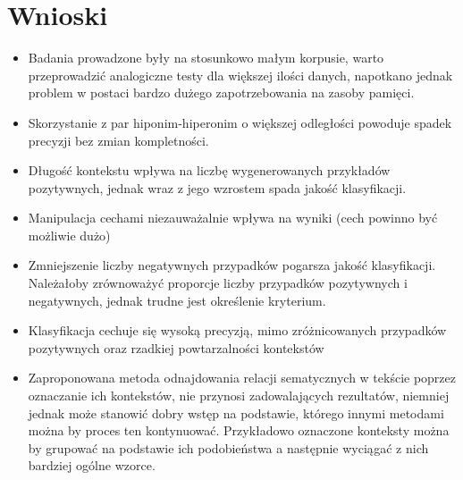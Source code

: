 \documentclass[a4paper,10pt]{report}
\begin{document}
\section{Wnioski}
\begin{itemize}
\item Badania prowadzone były na stosunkowo małym korpusie, warto przeprowadzić analogiczne testy dla większej ilości danych,
napotkano jednak problem w postaci bardzo dużego zapotrzebowania na zasoby pamięci.  

\item Skorzystanie z par hiponim-hiperonim o większej odległości powoduje spadek precyzji bez zmian kompletności.

\item Długość kontekstu wpływa na liczbę wygenerowanych przykładów pozytywnych, jednak wraz z jego wzrostem spada jakość klasyfikacji.

\item Manipulacja cechami niezauważalnie wpływa na wyniki (cech powinno być możliwie dużo)

\item Zmniejszenie liczby negatywnych przypadków pogarsza jakość klasyfikacji. Należałoby zrównoważyć proporcje liczby przypadków pozytywnych i negatywnych, jednak trudne jest określenie kryterium.

\item Klasyfikacja cechuje się wysoką precyzją, mimo zróżnicowanych przypadków pozytywnych oraz rzadkiej powtarzalności kontekstów

\item Zaproponowana metoda odnajdowania relacji sematycznych w tekście poprzez oznaczanie ich kontekstów, nie przynosi zadowalających rezultatów, niemniej jednak może stanowić dobry wstęp na podstawie, którego innymi metodami można by proces ten kontynuować. Przykładowo oznaczone konteksty można by grupować na podstawie ich podobieństwa a następnie wyciągać z nich bardziej ogólne wzorce. 
\end{itemize}


\nocite{*}

\end{document}
